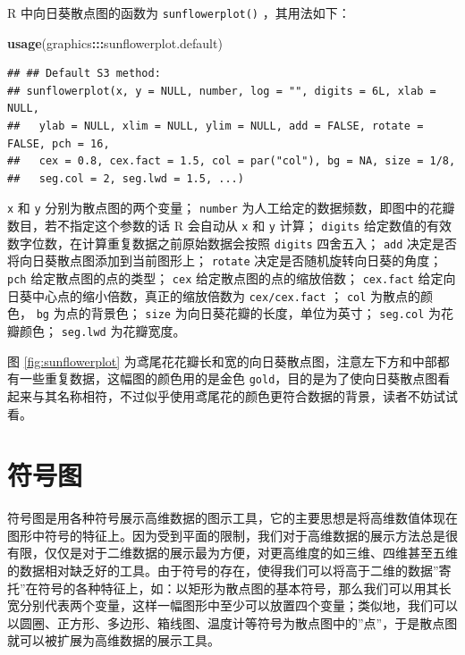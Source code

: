 \documentclass[
  b5paper,
  UTF8,twoside]{book}
\newenvironment{Shaded}{\begin{snugshade}}{\end{snugshade}}
\newcommand{\FunctionTok}[1]{\textcolor[rgb]{0.13,0.29,0.53}{\textbf{#1}}}
\newcommand{\NormalTok}[1]{#1}
\newcommand{\SpecialCharTok}[1]{\textcolor[rgb]{0.81,0.36,0.00}{\textbf{#1}}}
\begin{document}
R 中向日葵散点图的函数为 \texttt{sunflowerplot()} ，其用法如下：

\begin{Shaded}
\begin{Highlighting}[]
\FunctionTok{usage}\NormalTok{(graphics}\SpecialCharTok{:::}\NormalTok{sunflowerplot.default)}
\end{Highlighting}
\end{Shaded}

\begin{verbatim}
## ## Default S3 method:
## sunflowerplot(x, y = NULL, number, log = "", digits = 6L, xlab = NULL,
##   ylab = NULL, xlim = NULL, ylim = NULL, add = FALSE, rotate = FALSE, pch = 16,
##   cex = 0.8, cex.fact = 1.5, col = par("col"), bg = NA, size = 1/8,
##   seg.col = 2, seg.lwd = 1.5, ...)
\end{verbatim}

\texttt{x} 和 \texttt{y} 分别为散点图的两个变量； \texttt{number} 为人工给定的数据频数，即图中的花瓣数目，若不指定这个参数的话 R 会自动从 \texttt{x} 和 \texttt{y} 计算； \texttt{digits} 给定数值的有效数字位数，在计算重复数据之前原始数据会按照 \texttt{digits} 四舍五入； \texttt{add} 决定是否将向日葵散点图添加到当前图形上； \texttt{rotate} 决定是否随机旋转向日葵的角度； \texttt{pch} 给定散点图的点的类型； \texttt{cex} 给定散点图的点的缩放倍数； \texttt{cex.fact} 给定向日葵中心点的缩小倍数，真正的缩放倍数为 \texttt{cex/cex.fact} ； \texttt{col} 为散点的颜色， \texttt{bg} 为点的背景色； \texttt{size} 为向日葵花瓣的长度，单位为英寸； \texttt{seg.col} 为花瓣颜色； \texttt{seg.lwd} 为花瓣宽度。

图 \ref{fig:sunflowerplot} 为鸢尾花花瓣长和宽的向日葵散点图，注意左下方和中部都有一些重复数据，这幅图的颜色用的是金色 \texttt{\textquotesingle{}gold\textquotesingle{}}，目的是为了使向日葵散点图看起来与其名称相符，不过似乎使用鸢尾花的颜色更符合数据的背景，读者不妨试试看。

\section{符号图}\label{sec:symbols}

符号图是用各种符号展示高维数据的图示工具，它的主要思想是将高维数值体现在图形中符号的特征上。因为受到平面的限制，我们对于高维数据的展示方法总是很有限，仅仅是对于二维数据的展示最为方便，对更高维度的如三维、四维甚至五维的数据相对缺乏好的工具。由于符号的存在，使得我们可以将高于二维的数据''寄托''在符号的各种特征上，如：以矩形为散点图的基本符号，那么我们可以用其长宽分别代表两个变量，这样一幅图形中至少可以放置四个变量；类似地，我们可以以圆圈、正方形、多边形、箱线图、温度计等符号为散点图中的''点''，于是散点图就可以被扩展为高维数据的展示工具。
\end{document}
